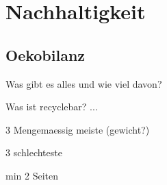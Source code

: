 \section{Nachhaltigkeit}

\subsection{Oekobilanz}

Was gibt es alles und wie viel davon?

Was ist recyclebar? ...

3 Mengemaessig meiste (gewicht?)

3 schlechteste

min 2 Seiten